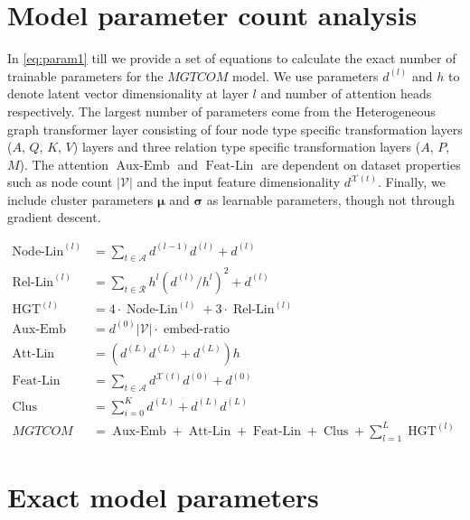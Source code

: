 \section{Model parameter count analysis} \label{sec:exact_params}
In \cref{eq:param1} till \label{eq:param7} we provide a set of equations to calculate the exact number of trainable parameters for the $MGTCOM$ model.
We use parameters $d^{(l)}$ and $h$ to denote latent vector dimensionality at layer $l$ and number of attention heads respectively.
The largest number of parameters come from the Heterogeneous graph transformer layer consisting of four node type specific transformation layers ($A$, $Q$, $K$, $V$) layers and three relation type specific transformation layers ($A$, $P$, $M$). 
The attention $\operatorname{Aux-Emb}$ and $\operatorname{Feat-Lin}$ are dependent on dataset properties such as node count $|\mathcal{V}|$ and the input feature dimensionality $d^{\mathcal{X}(t)}$.
Finally, we include cluster parameters $\boldsymbol{\mu}$ and $\boldsymbol{\sigma}$ as learnable parameters, though not through gradient descent.


\begin{align}
    \operatorname{Node-Lin}^{(l)} &=  \sum_{t \in \mathcal{A}} d^{(l-1)}d^{(l)} + d^{(l)} \label{eq:param1} \\
    \operatorname{Rel-Lin}^{(l)} &= \sum_{t \in \mathcal{R}} h^{l}(d^{(l)} / h^{l})^2 + d^{(l)} \\
    \operatorname{HGT}^{(l)} &= 4 \cdot \operatorname{Node-Lin}^{(l)} + 3 \cdot \operatorname{Rel-Lin}^{(l)}\\
    \operatorname{Aux-Emb} &= d^{(0)} |\mathcal{V}|\cdot \operatorname{embed-ratio}\\
    \operatorname{Att-Lin} &= (d^{(L)}d^{(L)} + d^{(L)})h \\
    \operatorname{Feat-Lin} &= \sum_{t \in \mathcal{A}} d^{\mathcal{X}(t)}d^{(0)} + d^{(0)}\\
    \operatorname{Clus} &= \sum_{i=0}^K d^{(L)} + d^{(L)}d^{(L)}\\
    MGTCOM &= \operatorname{Aux-Emb} + \operatorname{Att-Lin} + \operatorname{Feat-Lin} + \operatorname{Clus} + \sum_{l=1}^L \operatorname{HGT}^{(l)} \label{eq:param7}
\end{align}

\section{Exact model parameters}
